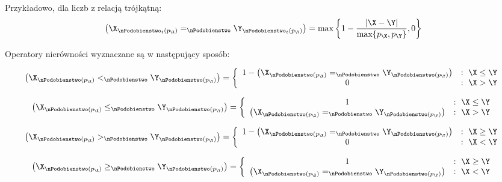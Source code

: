 \documentclass[a4paper,twoside,12pt]{book}
\begin{document}
Przykładowo, dla liczb z relacją trójkątną:
\begin{align}
	\left(\X_{\nPodobienstwo_{t}(p_{\X})} =_{\nPodobienstwo} \Y_{\nPodobienstwo_{t}(p_{\Y})}\right) = \max \left\{1 - \frac{|\X-\Y|}{\max\{p_{\X},p_{\Y}\}}, 0 \right\}
\end{align}

Operatory nierówności wyznaczane są w następujący sposób:

\begin{align}
	\left(\X_{\nPodobienstwo(p_{\X})} <_{\nPodobienstwo} \Y_{\nPodobienstwo(p_{\Y})}\right) = \left\{ \begin{array}{cl}
	1 -  \left(\X_{\nPodobienstwo(p_{\X})} =_{\nPodobienstwo} \Y_{\nPodobienstwo(p_{\Y})}\right) & : \  \X \le \Y \\
	0 & : \ \X > \Y
	\end{array} \right.
\end{align}

\begin{align}
	\left(\X_{\nPodobienstwo(p_{\X})} \le_{\nPodobienstwo} \Y_{\nPodobienstwo(p_{\Y})}\right) = \left\{ \begin{array}{cl}
	1 & : \  \X \le \Y \\
	\left(\X_{\nPodobienstwo(p_{\X})} =_{\nPodobienstwo} \Y_{\nPodobienstwo(p_{\Y})}\right) & : \ \X > \Y
	\end{array} \right.
\end{align}

\begin{align}
	\left(\X_{\nPodobienstwo(p_{\X})} >_{\nPodobienstwo} \Y_{\nPodobienstwo(p_{\Y})}\right) = \left\{ \begin{array}{cl}
	1 -  \left(\X_{\nPodobienstwo(p_{\X})} =_{\nPodobienstwo} \Y_{\nPodobienstwo(p_{\Y})}\right) & : \  \X \ge \Y \\
	0 & : \ \X < \Y
	\end{array} \right.
\end{align}

\begin{align}
	\left(\X_{\nPodobienstwo(p_{\X})} \ge_{\nPodobienstwo} \Y_{\nPodobienstwo(p_{\Y})}\right) = \left\{ \begin{array}{cl}
	1 & : \  \X \ge \Y \\
	\left(\X_{\nPodobienstwo(p_{\X})} =_{\nPodobienstwo} \Y_{\nPodobienstwo(p_{\Y})}\right) & : \ \X < \Y
	\end{array} \right.
\end{align}


\end{document}

